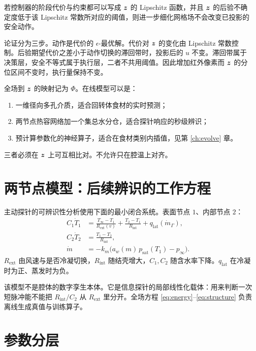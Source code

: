 \begin{proposition}
若控制器的阶段代价与约束都可以写成 $\bm{z}$ 的 Lipschitz 函数，并且 $\bm{z}$ 的后验不确定度低于该 Lipschitz 常数所对应的阈值，则进一步细化网格场不会改变已投影的安全动作。
\end{proposition}

论证分为三步。动作是代价的 $\epsilon$-最优解。代价对 $\bm{z}$ 的变化由 Lipschitz 常数控制。后验期望代价之差小于动作切换的滞回带时，投影后的 $u$ 不变。滞回带属于决策层，安全不等式属于执行层，二者不共用阈值。因此增加红外像素而 $\bm{z}$ 的分位区间不变时，执行量保持不变。

全场到 $\bm{z}$ 的映射记为 $\Phi$。在线模型可以是：
\begin{enumerate}
\item 一维径向多孔介质，适合回转体食材的实时预测；
\item 两节点热容网络加一个集总水分仓，适合探针响应的秒级辨识；
\item 预计算参数化的神经算子，适合在食材类别内插值，见第 \ref{ch:evolve} 章。
\end{enumerate}
三者必须在 $\bm{z}$ 上可互相比对。不允许只在腔温上对齐。

\section{两节点模型：后续辨识的工作方程}

主动探针的可辨识性分析使用下面的最小闭合系统。表面节点 $1$、内部节点 $2$：
\begin{align}
\label{eq:twonode}
C_1\dot T_1
&=\frac{T_\infty-T_1}{R_{\mathrm{ext}}(v)}+\frac{T_2-T_1}{R_{\mathrm{int}}}
+q_{\mathrm{lat}}(\dot m_\Gamma),\\
C_2\dot T_2
&=\frac{T_1-T_2}{R_{\mathrm{int}}},\\
\dot m
&=-k_m\big(a_w(m)\,p_{\mathrm{sat}}(T_1)-p_\infty\big).
\end{align}
$R_{\mathrm{ext}}$ 由风速与是否冷凝切换，$R_{\mathrm{int}}$ 随结壳增大，$C_1,C_2$ 随含水率下降。$q_{\mathrm{lat}}$ 在冷凝时为正、蒸发时为负。

该模型不是腔体的数字孪生本体。它是信息探针的局部线性化载体：用来判断一次短脉冲能不能把 $R_{\mathrm{int}}/C_2$ 从 $R_{\mathrm{ext}}$ 里分开。全场方程 \eqref{eq:energy}--\eqref{eq:structure} 负责离线生成真值与训练算子。

\section{参数分层}

